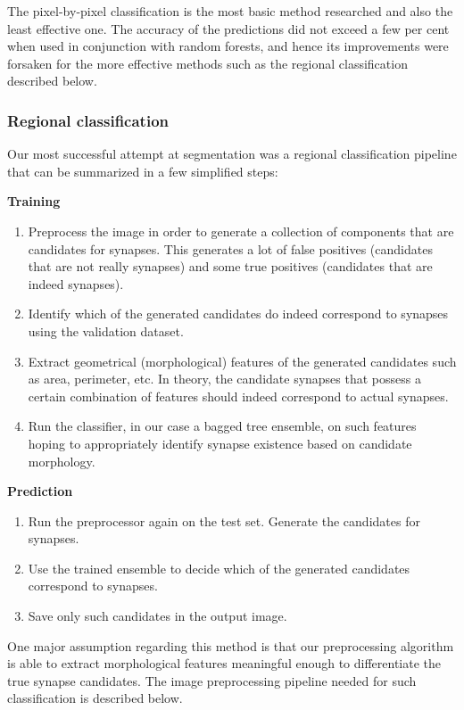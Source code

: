 \documentclass[a4paper, 11pt]{article}
\numberwithin{equation}{section}
\begin{document}
		\noindent The pixel-by-pixel classification is the most basic method researched and also the least effective one. The accuracy of the predictions did not exceed a few per cent when used in conjunction with random forests, and hence its improvements were forsaken for the more effective methods such as the regional classification described below.
		
		\subsubsection{Regional classification}
		Our most successful attempt at segmentation was a regional classification pipeline that can be summarized in a few simplified steps:
		
		\noindent \textbf{Training}
		\begin{enumerate}
			\item Preprocess the image in order to generate a collection of components that are candidates for synapses. This generates a lot of false positives (candidates that are not really synapses) and some true positives (candidates that are indeed synapses).
			\item Identify which of the generated candidates do indeed correspond to synapses using the validation dataset.
			\item Extract geometrical (morphological) features of the generated candidates such as area, perimeter, etc. In theory, the candidate synapses that possess a certain combination of features should indeed correspond to actual synapses.
			\item Run the classifier, in our case a bagged tree ensemble, on such features hoping to appropriately identify synapse existence based on candidate morphology.
		\end{enumerate}
		
		\noindent \textbf{Prediction}
		\begin{enumerate}
			\item Run the preprocessor again on the test set. Generate the candidates for synapses.
			\item Use the trained ensemble to decide which of the generated candidates correspond to synapses.
			\item Save only such candidates in the output image.
		\end{enumerate}
		
		\noindent One major assumption regarding this method is that our preprocessing algorithm is able to extract morphological features meaningful enough to differentiate the true synapse candidates. The image preprocessing pipeline needed for such classification is described below.
		
\end{document}
